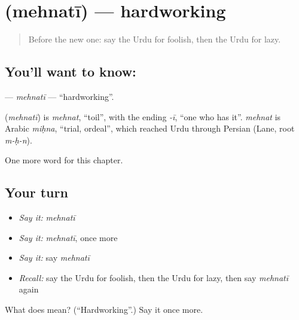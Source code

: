 \section[\texorpdfstring{\ur{محنتی} (mehnatī)}{محنتی (mehnatī)}]{ (mehnatī) — hardworking}

\label{lesson:UR-C160-mehnati}



\begin{quote}
Before the new one: say the Urdu for foolish, then the Urdu for lazy.
\end{quote}

\subsection*{You'll want to know: }
\textbf{} — \emph{mehnatī} — \textquotedblleft{}hardworking\textquotedblright{}.

\begin{cousinweb}
\textbf{} (\emph{mehnatī}) is \emph{mehnat}, \textquotedblleft{}toil\textquotedblright{}, with the ending \emph{-ī}, \textquotedblleft{}one who has it\textquotedblright{}. \emph{mehnat} is Arabic \emph{miḥna}, \textquotedblleft{}trial, ordeal\textquotedblright{}, which reached Urdu through Persian (Lane, root \emph{m-ḥ-n}).
\end{cousinweb}

\begin{grammarlens}[title={What you've built}]
One more word for this chapter.
\end{grammarlens}

\subsection*{Your turn}
\begin{itemize}
\raggedright
  \item \emph{Say it:} \emph{mehnatī}
  \item \emph{Say it:} \emph{mehnatī}, once more
  \item \emph{Say it:} say \emph{mehnatī}
  \item \emph{Recall:} say the Urdu for foolish, then the Urdu for lazy, then say \emph{mehnatī} again
\end{itemize}

\begin{tcolorbox}[breakable,colback=teal!4,colframe=teal!35!black,title={Before you move on}]
What does  mean? (\textquotedblleft{}Hardworking\textquotedblright{}.) Say it once more.
\end{tcolorbox}
